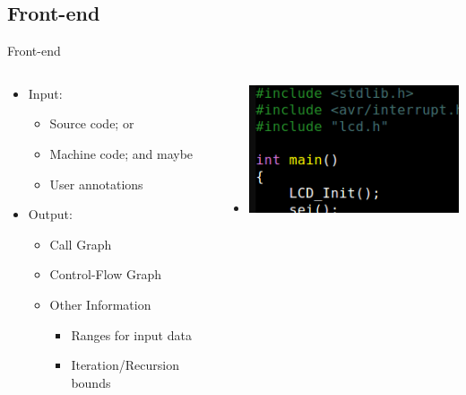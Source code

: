 \documentclass{beamer}
\begin{document}
\subsection{Front-end}
\begin{frame}{Front-end}
  \begin{columns}
    \begin{column}{0.6\textwidth}
      \begin{itemize}
        \item<1-> Input:
          \begin{itemize}
            \item Source code; or
            \item Machine code; and maybe
            \item User annotations
          \end{itemize}
        \item<2-> Output:
          \begin{itemize}
            \item Call Graph
            \item Control-Flow Graph
            \item Other Information
              \begin{itemize}
              \item Ranges for input data
              \item Iteration/Recursion bounds
              \end{itemize}
          \end{itemize}
      \end{itemize}
    \end{column}
    \begin{column}{0.4\textwidth}
      \begin{center}
        \begin{itemize}
          \item<1->[] \includegraphics[scale=0.3]{code.png}

\end{itemize}
\end{center}
\end{column}
\end{columns}
\end{frame}
\end{document}
